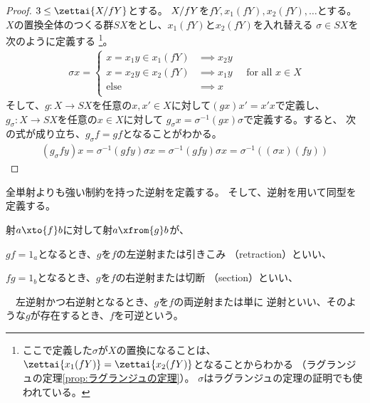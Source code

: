 \begin{proof}
		$3\le\zettai{\lcoset{X}{fY}}$とする。
		${X}/{fY}$を$fY,x_1(fY),x_2(fY),\dots$とする。
		$X$の置換全体のつくる群$SX$をとし、$x_1(fY)$と$x_2(fY)$を入れ替える
		$\sigma\in SX$を次のように定義する
		\footnote{
			ここで定義した$\sigma$が$X$の置換になることは、
			$\zettai{x_1(fY)}=\zettai{x_2(fY)}$となることからわかる
			（ラグランジュの定理\ref{prop:ラグランジュの定理}）。
			$\sigma$はラグランジュの定理の証明でも使われている。
		}。
		\begin{equation*}\begin{split} %
			\sigma x = \begin{cases}
				x = x_1y\in x_1(fY) &\implies x_2y \\
				x = x_2y\in x_2(fY) &\implies x_1y \\
				\text{else} &\implies x \\
			\end{cases} \quad\text{for all }x\in X
		\end{split}\end{equation*} %
		そして、$g:X\to SX$を任意の$x,x'\in X$に対して$(gx)x'=x'x$で定義し、
		$g_\sigma:X\to SX$を任意の$x\in X$に対して
		$g_\sigma x=\sigma^{-1}(gx)\sigma$で定義する。すると、
		次の式が成り立ち、$g_\sigma f=gf$となることがわかる。
		\begin{equation*}\begin{split} %
			(g_\sigma fy)x = \sigma^{-1}(gfy)\sigma x 
			= \sigma^{-1}(gfy)\sigma x 
			= \sigma^{-1}\left((\sigma x)(fy)\right)
		\end{split}\end{equation*} %
	\end{proof} %

	全単射よりも強い制約を持った逆射を定義する。
	そして、逆射を用いて同型を定義する。

	\begin{definition}[逆射]\label{def:逆射} %
		射$a\xto{f}b$に対して射$a\xfrom{g}b$が、
		\begin{description}\setlength{\itemsep}{-1mm} %
			\item[左逆射] $gf=1_a$となるとき、$g$を$f$の左逆射または引きこみ
			（retraction）といい、
			\item[右逆射] $fg=1_b$となるとき、$g$を$f$の右逆射または切断
			（section）といい、
			\item[逆射]　左逆射かつ右逆射となるとき、$g$を$f$の両逆射または単に
			逆射といい、そのような$g$が存在するとき、$f$を可逆という。
		\end{description} %
	\end{definition} %

